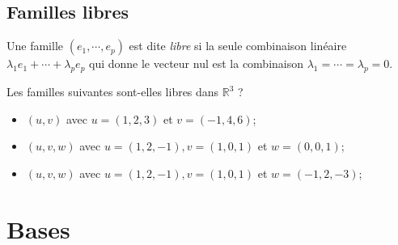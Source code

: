 \vspace{3em}
\subsection*{Familles libres}
Une famille $(e_1, \cdots, e_p)$ est dite \emph{libre} si la seule combinaison linéaire $\lambda_1 e_1 + \cdots + \lambda_p e_p$ qui donne le vecteur nul est la combinaison $\lambda_1 = \cdots = \lambda_p = 0$.

Les familles suivantes sont-elles libres dans $\mathbb{R}^3$ ?
\begin{itemize}
    \item $(u, v)$ avec $u=(1,2,3)$ et $v=(-1,4,6)$;
    \item $(u, v, w)$ avec $u=(1,2,-1), v=(1,0,1)$ et $w=(0,0,1)$;
    \item $(u, v, w)$ avec $u=(1,2,-1), v=(1,0,1)$ et $w=(-1,2,-3)$;
\end{itemize}

\section*{Bases}
